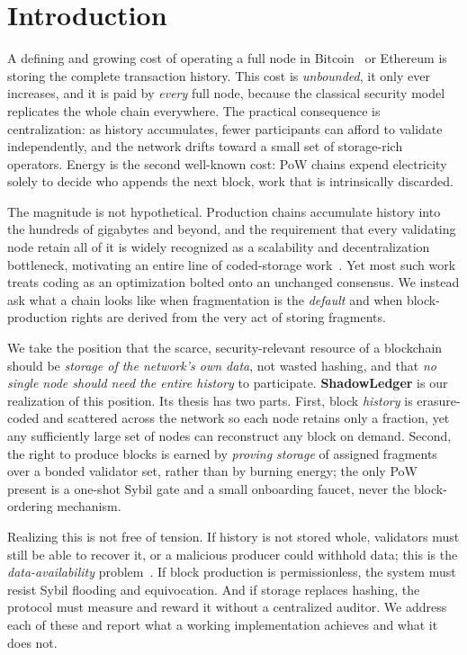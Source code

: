 \section{Introduction}
A defining and growing cost of operating a full node in Bitcoin~\cite{nakamoto2008bitcoin} or
Ethereum is storing the complete transaction history. This cost is \emph{unbounded}, it
only ever increases, and it is paid by \emph{every} full node, because the classical
security model replicates the whole chain everywhere. The practical consequence is
centralization: as history accumulates, fewer participants can afford to validate
independently, and the network drifts toward a small set of storage-rich operators. Energy
is the second well-known cost: PoW chains expend electricity solely to decide who appends the
next block, work that is intrinsically discarded.

The magnitude is not hypothetical. Production chains accumulate history into the hundreds of
gigabytes and beyond, and the requirement that every validating node retain all of it is widely
recognized as a scalability and decentralization bottleneck, motivating an entire line of
coded-storage work~\cite{yang2024scaling,perard2018erasure}. Yet most such work treats coding as
an optimization bolted onto an unchanged consensus. We instead ask what a chain looks like when
fragmentation is the \emph{default} and when block-production rights are derived from the very act
of storing fragments.

We take the position that the scarce, security-relevant resource of a blockchain should be
\emph{storage of the network's own data}, not wasted hashing, and that \emph{no single node
should need the entire history} to participate. \textbf{ShadowLedger} is our realization of
this position. Its thesis has two parts. First, block \emph{history} is erasure-coded and
scattered across the network so each node retains only a fraction, yet any sufficiently large
set of nodes can reconstruct any block on demand. Second, the right to produce blocks is
earned by \emph{proving storage} of assigned fragments over a bonded validator set, rather
than by burning energy; the only PoW present is a one-shot Sybil gate and a small onboarding
faucet, never the block-ordering mechanism.

Realizing this is not free of tension. If history is not stored whole, validators must still
be able to recover it, or a malicious producer could withhold data; this is the
\emph{data-availability} problem~\cite{albassam2021fraud,yu2020coded}. If block production is
permissionless, the system must resist Sybil flooding and equivocation. And if storage
replaces hashing, the protocol must measure and reward it without a centralized auditor. We
address each of these and report what a working implementation achieves and what it does not.

